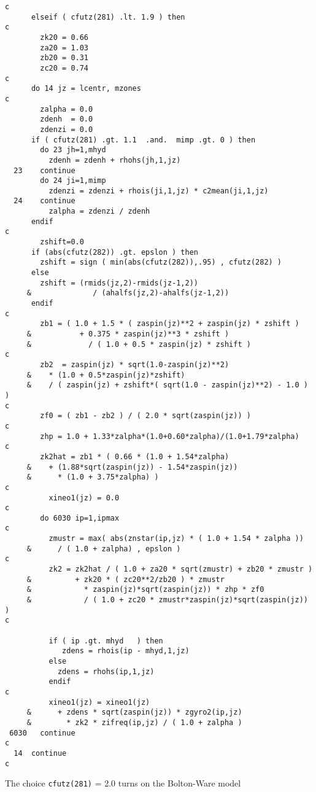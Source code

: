 \begin{verbatim}
c
      elseif ( cfutz(281) .lt. 1.9 ) then
c
        zk20 = 0.66
        za20 = 1.03
        zb20 = 0.31
        zc20 = 0.74
c
      do 14 jz = lcentr, mzones
c
        zalpha = 0.0
        zdenh  = 0.0
        zdenzi = 0.0
      if ( cfutz(281) .gt. 1.1  .and.  mimp .gt. 0 ) then
        do 23 jh=1,mhyd
          zdenh = zdenh + rhohs(jh,1,jz)
  23    continue
        do 24 ji=1,mimp
          zdenzi = zdenzi + rhois(ji,1,jz) * c2mean(ji,1,jz)
  24    continue
          zalpha = zdenzi / zdenh
      endif
c
        zshift=0.0
      if (abs(cfutz(282)) .gt. epslon ) then
        zshift = sign ( min(abs(cfutz(282)),.95) , cfutz(282) )
      else
        zshift = (rmids(jz,2)-rmids(jz-1,2))
     &              / (ahalfs(jz,2)-ahalfs(jz-1,2))
      endif
c
        zb1 = ( 1.0 + 1.5 * ( zaspin(jz)**2 + zaspin(jz) * zshift )
     &           + 0.375 * zaspin(jz)**3 * zshift )
     &             / ( 1.0 + 0.5 * zaspin(jz) * zshift )
c
        zb2  = zaspin(jz) * sqrt(1.0-zaspin(jz)**2) 
     &    * (1.0 + 0.5*zaspin(jz)*zshift)
     &    / ( zaspin(jz) + zshift*( sqrt(1.0 - zaspin(jz)**2) - 1.0 ) )
c
        zf0 = ( zb1 - zb2 ) / ( 2.0 * sqrt(zaspin(jz)) )
c
        zhp = 1.0 + 1.33*zalpha*(1.0+0.60*zalpha)/(1.0+1.79*zalpha)
c
        zk2hat = zb1 * ( 0.66 * (1.0 + 1.54*zalpha)
     &    + (1.88*sqrt(zaspin(jz)) - 1.54*zaspin(jz))
     &      * (1.0 + 3.75*zalpha) )
c
          xineo1(jz) = 0.0
c
        do 6030 ip=1,ipmax
c
          zmustr = max( abs(znstar(ip,jz) * ( 1.0 + 1.54 * zalpha ))
     &      / ( 1.0 + zalpha) , epslon )
c
          zk2 = zk2hat / ( 1.0 + za20 * sqrt(zmustr) + zb20 * zmustr )
     &          + zk20 * ( zc20**2/zb20 ) * zmustr
     &            * zaspin(jz)*sqrt(zaspin(jz)) * zhp * zf0
     &            / ( 1.0 + zc20 * zmustr*zaspin(jz)*sqrt(zaspin(jz)) )
c
 
          if ( ip .gt. mhyd   ) then
             zdens = rhois(ip - mhyd,1,jz)
          else
            zdens = rhohs(ip,1,jz)
          endif
c
          xineo1(jz) = xineo1(jz)
     &      + zdens * sqrt(zaspin(jz)) * zgyro2(ip,jz) 
     &        * zk2 * zifreq(ip,jz) / ( 1.0 + zalpha )
 6030   continue
c
  14  continue
c
\end{verbatim}

The choice {\tt cfutz(281)} = 2.0 turns on the
Bolton-Ware model\cite{bolt83a}

